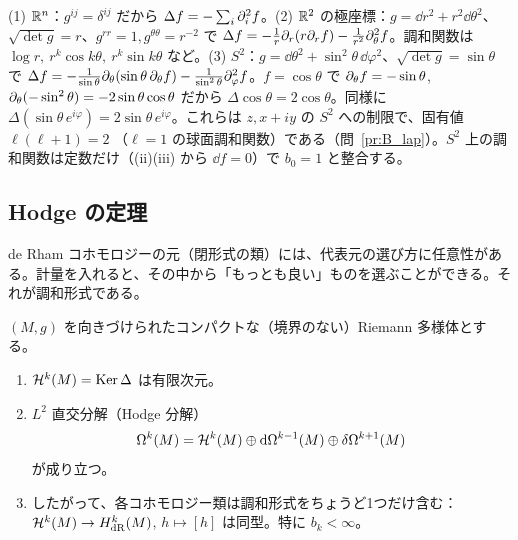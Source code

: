 \begin{ex}[具体例]\label{B:ex:lap}
(1) $\mathbb R^n$：$g^{ij}=\delta^{ij}$ だから $\Delta f=-\sum_i\partial_i^2f$。(2) $\mathbb R^2$ の極座標：$g=\dd r^2+r^2\dd\theta^2$、$\sqrt{\det g}=r$、$g^{rr}=1,g^{\theta\theta}=r^{-2}$ で
$\Delta f=-\frac1r\partial_r(r\partial_rf)-\frac1{r^2}\partial_\theta^2f$。調和関数は $\log r,\ r^k\cos k\theta,\ r^k\sin k\theta$ など。(3) $S^2$：$g=\dd\theta^2+\sin^2\theta\,\dd\varphi^2$、$\sqrt{\det g}=\sin\theta$ で
$\Delta f=-\frac1{\sin\theta}\partial_\theta(\sin\theta\,\partial_\theta f)-\frac1{\sin^2\theta}\partial_\varphi^2f$。$f=\cos\theta$ で $\partial_\theta f=-\sin\theta$, $\partial_\theta(-\sin^2\theta)=-2\sin\theta\cos\theta$ だから $\Delta\cos\theta=2\cos\theta$。同様に $\Delta(\sin\theta\,e^{i\varphi})=2\sin\theta\,e^{i\varphi}$。これらは $z,x+iy$ の $S^2$ への制限で、固有値 $\ell(\ell+1)=2$ （$\ell=1$ の球面調和関数）である（問~\ref{pr:B_lap}）。$S^2$ 上の調和関数は定数だけ（(ii)(iii) から $\dd f=0$）で $b_0=1$ と整合する。
\end{ex}

\subsection{Hodge の定理}\label{B:ss:HodgeThm}

de Rham コホモロジーの元（閉形式の類）には、代表元の選び方に任意性がある。計量を入れると、その中から「もっとも良い」ものを選ぶことができる。それが調和形式である。

\begin{thm}\label{B:thm:Hodge}\tC
$(M,g)$ を向きづけられたコンパクトな（境界のない）\mbox{Riemann} 多様体とする。
\begin{enumerate}[label=(\roman*)]
\item $\mathcal H^k(M)=\operatorname{Ker}\Delta$ は有限次元。
\item $L^2$ 直交分解（Hodge 分解）
\[
\Omega^k(M)=\mathcal H^k(M)\oplus\mathrm{d}\Omega^{k-1}(M)\oplus\delta\Omega^{k+1}(M)
\]
が成り立つ。
\item したがって、各コホモロジー類は調和形式をちょうど1つだけ含む：$\mathcal H^k(M)\to H^k_{\rm dR}(M)$, $h\mapsto[h]$ は同型。特に $b_k<\infty$。
\end{enumerate}
\end{thm}

